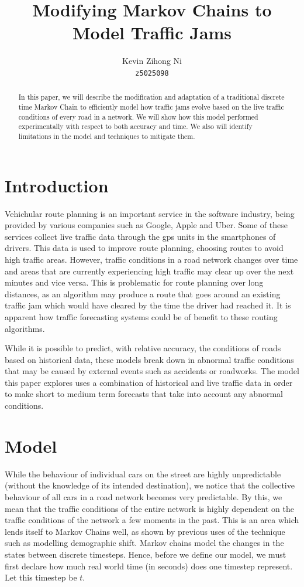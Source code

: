\documentclass[a4paper]{article}
\title{Modifying Markov Chains to Model Traffic Jams}
\author{Kevin Zihong Ni\\\texttt{z5025098}}
\begin{document}
\maketitle

\begin{abstract}
	In this paper, we will describe the modification and adaptation of a traditional discrete time Markov Chain to efficiently model how 
	traffic jams evolve based on the live traffic conditions of every road in a network.
	We will show how this model performed experimentally with respect to both accuracy and time.
	We also will identify limitations in the model and techniques to mitigate them.
\end{abstract}

\section{Introduction}
Vehichular route planning is an important service in the software industry, being provided by various companies such as Google, Apple and Uber.
Some of these services collect live traffic data through the gps units in the smartphones of drivers.
This data is used to improve route planning, choosing routes to avoid high traffic areas.
However, traffic conditions in a road network changes over time and areas that are currently experiencing high traffic may clear up over the next minutes and vice versa.
This is problematic for route planning over long distances, 
as an algorithm may produce a route that goes around an existing traffic jam which would have cleared by the time the driver had reached it.  
It is apparent how traffic forecasting systems could be of benefit to these routing algorithms.

While it is possible to predict, with relative accuracy, the conditions of roads based on historical data, 
these models break down in abnormal traffic conditions that may be caused by external events such as accidents or roadworks.
The model this paper explores uses a combination of historical and live traffic data in order to make short to medium term forecasts that take into account any 
abnormal conditions. 

\section{Model}
While the behaviour of individual cars on the street are highly unpredictable (without the knowledge of its intended destination), we notice that the collective behaviour 
of all cars in a road network becomes very predictable.
By this, we mean that the traffic conditions of the entire network is highly dependent on the traffic conditions of the network a few moments in the past.
This is an area which lends itself to Markov Chains well, as shown by previous uses of the technique such as modelling demographic shift.
Markov chains model the changes in the states between discrete timesteps. 
Hence, before we define our model, we must first declare how much real world time (in seconds) does one timestep represent. 
Let this timestep be $t$.
\end{document}

